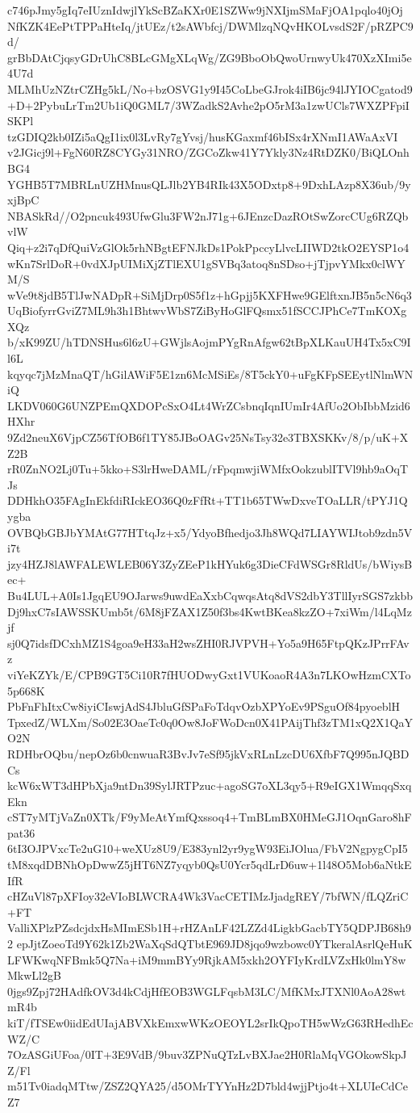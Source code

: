 c746pJmy5gIq7eIUznIdwjlYkScBZaKXr0E1SZWw9jNXIjmSMaFjOA1pqlo40jOj
NfKZK4EePtTPPaHteIq/jtUEz/t2sAWbfcj/DWMlzqNQvHKOLvsdS2F/pRZPC9d/
grBbDAtCjqsyGDrUhC8BLcGMgXLqWg/ZG9BboObQwoUrnwyUk470XzXImi5e4U7d
MLMhUzNZtrCZHg5kL/No+bzOSVG1y9I45CoLbeGJrok4iIB6jc94lJYIOCgatod9
+D+2PybuLrTm2Ub1iQ0GML7/3WZadkS2Avhe2pO5rM3a1zwUCls7WXZPFpiISKPl
tzGDIQ2kb0IZi5aQgI1ix0l3LvRy7gYvsj/husKGaxmf46bISx4rXNmI1AWaAxVI
v2JGicj9l+FgN60RZ8CYGy31NRO/ZGCoZkw41Y7Ykly3Nz4RtDZK0/BiQLOnhBG4
YGHB5T7MBRLnUZHMnusQLJlb2YB4RIk43X5ODxtp8+9DxhLAzp8X36ub/9yxjBpC
NBASkRd//O2pncuk493UfwGlu3FW2nJ71g+6JEnzcDazROtSwZorcCUg6RZQbvlW
Qiq+z2i7qDfQuiVzGlOk5rhNBgtEFNJkDs1PokPpccyLlvcLIIWD2tkO2EYSP1o4
wKn7SrlDoR+0vdXJpUIMiXjZTlEXU1gSVBq3atoq8nSDso+jTjpvYMkx0clWYM/S
wVe9t8jdB5TlJwNADpR+SiMjDrp0S5f1z+hGpjj5KXFHwe9GElftxnJB5n5cN6q3
UqBiofyrrGviZ7ML9h3h1BhtwvWbS7ZiByHoGlFQsmx51fSCCJPhCe7TmKOXgXQz
b/xK99ZU/hTDNSHus6l6zU+GWjlsAojmPYgRnAfgw62tBpXLKauUH4Tx5xC9Il6L
kqyqc7jMzMnaQT/hGilAWiF5E1zn6McMSiEs/8T5ckY0+uFgKFpSEEytlNlmWNiQ
LKDV060G6UNZPEmQXDOPcSxO4Lt4WrZCsbnqIqnIUmIr4AfUo2ObIbbMzid6HXhr
9Zd2neuX6VjpCZ56TfOB6f1TY85JBoOAGv25NsTsy32e3TBXSKKv/8/p/uK+XZ2B
rR0ZnNO2Lj0Tu+5kko+S3lrHweDAML/rFpqmwjiWMfxOokzublITVl9hb9aOqTJs
DDHkhO35FAgInEkfdiRIckEO36Q0zFfRt+TT1b65TWwDxveTOaLLR/tPYJ1Qygba
OVBQbGBJbYMAtG77HTtqJz+x5/YdyoBfhedjo3Jh8WQd7LIAYWIJtob9zdn5Vi7t
jzy4HZJ8lAWFALEWLEB06Y3ZyZEeP1kHYuk6g3DieCFdWSGr8RldUs/bWiysBec+
Bu4LUL+A0Is1JgqEU9OJarws9uwdEaXxbCqwqsAtq8dVS2dbY3TllIyrSGS7zkbb
Dj9hxC7sIAWSSKUmb5t/6M8jFZAX1Z50f3bs4KwtBKea8kzZO+7xiWm/l4LqMzjf
sj0Q7idsfDCxhMZ1S4goa9eH33aH2wsZHI0RJVPVH+Yo5a9H65FtpQKzJPrrFAvz
viYeKZYk/E/CPB9GT5Ci10R7fHUODwyGxt1VUKoaoR4A3n7LKOwHzmCXTo5p668K
PbFnFhItxCw8iyiCIswjAdS4JbluGfSPaFoTdqvOzbXPYoEv9PSguOf84pyoeblH
TpxedZ/WLXm/So02E3OaeTc0q0Ow8JoFWoDcn0X41PAijThf3zTM1xQ2X1QaYO2N
RDHbrOQbu/nepOz6b0cnwuaR3BvJv7eSf95jkVxRLnLzcDU6XfbF7Q995nJQBDCs
kcW6xWT3dHPbXja9ntDn39SylJRTPzuc+agoSG7oXL3qy5+R9eIGX1WmqqSxqEkn
cST7yMTjVaZn0XTk/F9yMeAtYmfQxssoq4+TmBLmBX0HMeGJ1OqnGaro8hFpat36
6tI3OJPVxcTe2uG10+weXUz8U9/E383ynl2yr9ygW93EiJOlua/FbV2NgpygCpI5
tM8xqdDBNhOpDwwZ5jHT6NZ7yqyb0QsU0Ycr5qdLrD6uw+1l48O5Mob6aNtkEIfR
cHZuVl87pXFIoy32eVIoBLWCRA4Wk3VacCETIMzJjadgREY/7bfWN/fLQZriC+FT
ValliXPlzPZsdcjdxHsMImESb1H+rHZAnLF42LZZd4LigkbGacbTY5QDPJB68h92
epJjtZoeoTd9Y62k1Zb2WaXqSdQTbtE969JD8jqo9wzbowc0YTkeralAsrlQeHuK
LFWKwqNFBmk5Q7Na+iM9mmBYy9RjkAM5xkh2OYFIyKrdLVZxHk0lmY8wMkwLl2gB
0jgs9Zpj72HAdfkOV3d4kCdjHfEOB3WGLFqsbM3LC/MfKMxJTXNl0AoA28wtmR4b
kiT/fTSEw0iidEdUIajABVXkEmxwWKzOEOYL2srIkQpoTH5wWzG63RHedhEcWZ/C
7OzASGiUFoa/0IT+3E9VdB/9buv3ZPNuQTzLvBXJae2H0RlaMqVGOkowSkpJZ/Fl
m51Tv0iadqMTtw/ZSZ2QYA25/d5OMrTYYnHz2D7bld4wjjPtjo4t+XLUIeCdCeZ7
